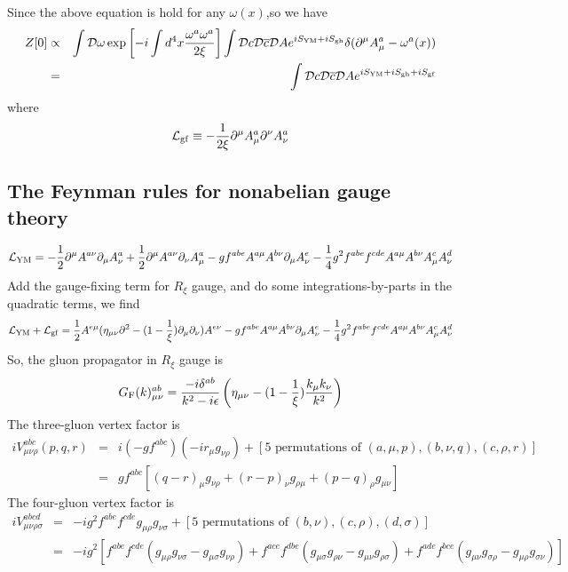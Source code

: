 Since the above equation is hold for any $\omega(x)$,so we have
\begin{eqnarray}
Z[0] &\propto& \int \mathcal{D}\omega \exp \left[-i\int d^4x \frac{\omega^a\omega^a}{2\xi} \right] \int \mathcal{D}c \mathcal{D}\overline{c} \mathcal{D}A e^{iS_{\rm YM} + iS_{\rm gh}} \delta(\partial^{\mu}A^a_{\mu}-\omega^a(x)) \nonumber \\
&=&  \int \mathcal{D}c \mathcal{D}\overline{c} \mathcal{D}A e^{iS_{\rm YM} + iS_{\rm gh} + iS_{\rm gf}}
\end{eqnarray}
where
\[\mathcal{L}_{\rm gf} \equiv -\frac{1}{2\xi}\partial^{\mu}A^a_{\mu} \partial^{\nu}A^a_{\nu}\]

\subsection{The Feynman rules for nonabelian gauge theory}
\[\mathcal{L}_{\rm YM} = -\frac{1}{2}\partial^{\mu}A^{a\nu} \partial_{\mu}A^a_{\nu} + \frac{1}{2}\partial^{\mu}A^{a\nu} \partial_{\nu}A^a_{\mu} -gf^{abe}A^{a\mu}A^{b\nu}\partial_{\mu}A^e_{\nu} - \frac{1}{4}g^2 f^{abe}f^{cde}A^{a\mu}A^{b\nu}A^c_{\mu}A^d_{\nu}\]
Add the gauge-fixing term for $R_{\xi}$ gauge, and do some integrations-by-parts in the quadratic terms, we find
\[\mathcal{L}_{\rm YM} + \mathcal{L}_{\rm gf} = \frac{1}{2}A^{e\mu}(\eta_{\mu\nu}\partial^2 -(1-\frac{1}{\xi}) \partial_{\mu}\partial_{\nu})A^{e\nu} -gf^{abe}A^{a\mu}A^{b\nu}\partial_{\mu}A^e_{\nu} - \frac{1}{4}g^2 f^{abe}f^{cde}A^{a\mu}A^{b\nu}A^c_{\mu}A^d_{\nu}\]
So, the gluon propagator in $R_{\xi}$ gauge is
\[G_{\rm F}(k)^{ab}_{\mu\nu} = \frac{-i\delta^{ab}}{k^2-i\epsilon} \left( \eta_{\mu\nu} - (1 - \frac{1}{\xi}) \frac{k_{\mu}k_{\nu}}{k^2} \right)\]
The three-gluon vertex factor is
\begin{eqnarray}
iV^{abc}_{\mu\nu\rho}(p,q,r) &=& i (-gf^{abc})(-ir_{\mu}g_{\nu\rho}) + [5 \mbox{ permutations of } (a,\mu,p),(b,\nu,q),(c,\rho,r)] \nonumber \\
&=& gf^{abc}[(q-r)_{\mu}g_{\nu\rho} + (r-p)_{\nu}g_{\rho\mu} + (p-q)_{\rho}g_{\mu\nu}] \nonumber
\end{eqnarray}
The four-gluon vertex factor is
\begin{eqnarray}
iV^{abcd}_{\mu\nu\rho\sigma} &=& -ig^2f^{abe} f^{cde} g_{\mu\rho}g_{\nu\sigma} + [5 \mbox{ permutations of } (b,\nu),(c,\rho),(d,\sigma)] \nonumber \\
&=& -ig^2 [f^{abe}f^{cde}(g_{\mu\rho}g_{\nu\sigma} - g_{\mu\sigma}g_{\nu\rho}) + f^{ace}f^{dbe}(g_{\mu\sigma}g_{\rho\nu} - g_{\mu\nu}g_{\rho\sigma}) + f^{ade}f^{bce}(g_{\mu\nu}g_{\sigma\rho} - g_{\mu\rho}g_{\sigma\nu})] \nonumber
\end{eqnarray}

